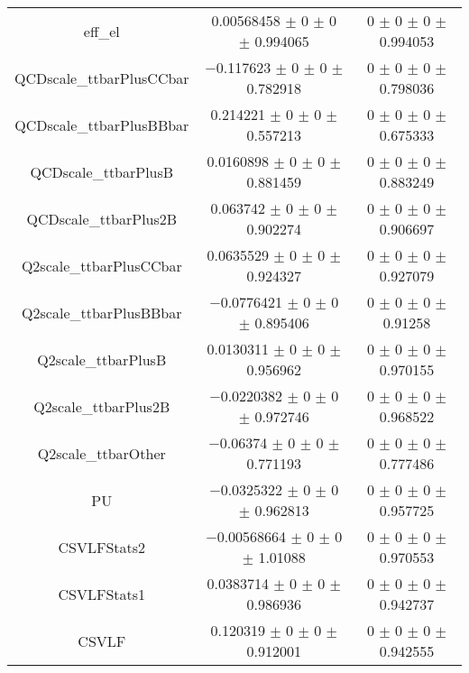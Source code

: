 \begin{table}
\begin{tabular}{ccc}
eff\_el 	& \num{0.00568458} $\pm$ \num{0} $\pm$ \num{0} $\pm$ \num{0.994065} 	& \num{0} $\pm$ \num{0} $\pm$ \num{0} $\pm$ \num{0.994053}\\
QCDscale\_ttbarPlusCCbar 	& \num{-0.117623} $\pm$ \num{0} $\pm$ \num{0} $\pm$ \num{0.782918} 	& \num{0} $\pm$ \num{0} $\pm$ \num{0} $\pm$ \num{0.798036}\\
QCDscale\_ttbarPlusBBbar 	& \num{0.214221} $\pm$ \num{0} $\pm$ \num{0} $\pm$ \num{0.557213} 	& \num{0} $\pm$ \num{0} $\pm$ \num{0} $\pm$ \num{0.675333}\\
QCDscale\_ttbarPlusB 	& \num{0.0160898} $\pm$ \num{0} $\pm$ \num{0} $\pm$ \num{0.881459} 	& \num{0} $\pm$ \num{0} $\pm$ \num{0} $\pm$ \num{0.883249}\\
QCDscale\_ttbarPlus2B 	& \num{0.063742} $\pm$ \num{0} $\pm$ \num{0} $\pm$ \num{0.902274} 	& \num{0} $\pm$ \num{0} $\pm$ \num{0} $\pm$ \num{0.906697}\\
Q2scale\_ttbarPlusCCbar 	& \num{0.0635529} $\pm$ \num{0} $\pm$ \num{0} $\pm$ \num{0.924327} 	& \num{0} $\pm$ \num{0} $\pm$ \num{0} $\pm$ \num{0.927079}\\
Q2scale\_ttbarPlusBBbar 	& \num{-0.0776421} $\pm$ \num{0} $\pm$ \num{0} $\pm$ \num{0.895406} 	& \num{0} $\pm$ \num{0} $\pm$ \num{0} $\pm$ \num{0.91258}\\
Q2scale\_ttbarPlusB 	& \num{0.0130311} $\pm$ \num{0} $\pm$ \num{0} $\pm$ \num{0.956962} 	& \num{0} $\pm$ \num{0} $\pm$ \num{0} $\pm$ \num{0.970155}\\
Q2scale\_ttbarPlus2B 	& \num{-0.0220382} $\pm$ \num{0} $\pm$ \num{0} $\pm$ \num{0.972746} 	& \num{0} $\pm$ \num{0} $\pm$ \num{0} $\pm$ \num{0.968522}\\
Q2scale\_ttbarOther 	& \num{-0.06374} $\pm$ \num{0} $\pm$ \num{0} $\pm$ \num{0.771193} 	& \num{0} $\pm$ \num{0} $\pm$ \num{0} $\pm$ \num{0.777486}\\
PU 	& \num{-0.0325322} $\pm$ \num{0} $\pm$ \num{0} $\pm$ \num{0.962813} 	& \num{0} $\pm$ \num{0} $\pm$ \num{0} $\pm$ \num{0.957725}\\
CSVLFStats2 	& \num{-0.00568664} $\pm$ \num{0} $\pm$ \num{0} $\pm$ \num{1.01088} 	& \num{0} $\pm$ \num{0} $\pm$ \num{0} $\pm$ \num{0.970553}\\
CSVLFStats1 	& \num{0.0383714} $\pm$ \num{0} $\pm$ \num{0} $\pm$ \num{0.986936} 	& \num{0} $\pm$ \num{0} $\pm$ \num{0} $\pm$ \num{0.942737}\\
CSVLF 	& \num{0.120319} $\pm$ \num{0} $\pm$ \num{0} $\pm$ \num{0.912001} 	& \num{0} $\pm$ \num{0} $\pm$ \num{0} $\pm$ \num{0.942555}\\

\end{tabular}
\end{table}
